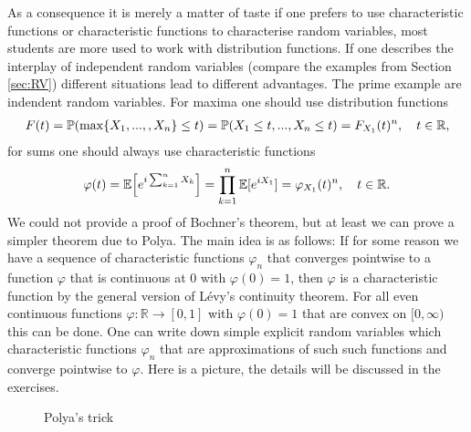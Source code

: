 As a consequence it is merely a matter of taste if one prefers to use characteristic functions or characteristic functions to characterise random variables, most students are more used to work with  distribution functions. If one describes the interplay of independent random variables (compare the examples from Section \ref{sec:RV}) different situations lead to different advantages. The prime example are indendent random variables. For maxima one should use distribution functions
\begin{align*}
	F(t)=\mathbb P(\max\{X_1,...,,X_n\}\leq t)=\mathbb P(X_1\leq t, ..., X_n\leq t)=F_{X_1}(t)^n,\quad t\in\mathbb{R},
\end{align*}
for sums one should always use characteristic functions
\begin{align*}
	\varphi (t)=\mathbb{E}\Big[e^{i \sum_{k=1}^n X_k}\Big]=\prod_{k=1}^n\mathbb{E}[e^{iX_1}]=\varphi_{X_1}(t)^n,\quad t\in\mathbb{R}.
\end{align*}
We could not provide a proof of Bochner's theorem, but at least we can prove a simpler theorem due to Polya. The main idea is as follows: If for some reason we have a sequence of characteristic functions $\varphi_n$ that converges pointwise to a function $\varphi$ that is continuous at $0$ with $\varphi(0)=1$, then $\varphi$ is a characteristic function by the general version of L\'evy's continuity theorem. For all even continuous functions $\varphi \colon \mathbb{R} \to [0,1]$ with $\varphi(0)=1$ that are convex on $[0,\infty)$ this can be done. One can write down simple explicit random variables which characteristic functions $\varphi_n$ that are approximations of such such functions and converge pointwise to $\varphi$. Here is a picture, the details will be discussed in the exercises.
\begin{figure}[h]
	\begin{center}
	\caption*{Polya's trick}
\end{center}
	\end{figure}

